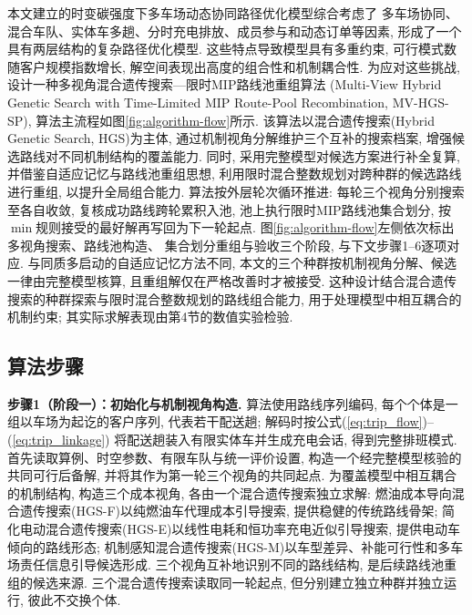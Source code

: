 \documentclass{setp-new}
\begin{document}
本文建立的时变碳强度下多车场动态协同路径优化模型综合考虑了
多车场协同、混合车队、实体车多趟、分时充电排放、成员参与和动态订单等因素,
形成了一个具有两层结构的复杂路径优化模型.
这些特点导致模型具有多重约束, 可行模式数随客户规模指数增长,
解空间表现出高度的组合性和机制耦合性.
为应对这些挑战, 设计一种多视角混合遗传搜索—限时MIP路线池重组算法
(Multi-View Hybrid Genetic Search with Time-Limited MIP Route-Pool Recombination, MV-HGS-SP),
算法主流程如图\ref{fig:algorithm-flow}所示.
该算法以混合遗传搜索(Hybrid Genetic Search, HGS)\cite{ref:76,ref:77}为主体,
通过机制视角分解维护三个互补的搜索档案, 增强候选路线对不同机制结构的覆盖能力.
同时, 采用完整模型对候选方案进行补全复算,
并借鉴自适应记忆与路线池重组思想\cite{ref:79,ref:80},
利用限时混合整数规划对跨种群的候选路线进行重组, 以提升全局组合能力.
算法按外层轮次循环推进: 每轮三个视角分别搜索至各自收敛,
复核成功路线跨轮累积入池, 池上执行限时MIP路线池集合划分,
按$\min$规则接受的最好解再写回为下一轮起点.
图\ref{fig:algorithm-flow}左侧依次标出多视角搜索、路线池构造、
集合划分重组与验收三个阶段, 与下文步骤1--6逐项对应.
与同质多启动的自适应记忆方法不同,
本文的三个种群按机制视角分解、候选一律由完整模型核算,
且重组解仅在严格改善时才被接受.
这种设计结合混合遗传搜索的种群探索与限时混合整数规划的路线组合能力,
用于处理模型中相互耦合的机制约束; 其实际求解表现由第4节的数值实验检验.



\subsection{算法步骤}

\textbf{步骤1（阶段一）：初始化与机制视角构造.}
算法使用路线序列编码, 每个个体是一组以车场为起讫的客户序列,
代表若干配送趟; 解码时按公式(\ref{eq:trip_flow})--(\ref{eq:trip_linkage})
将配送趟装入有限实体车并生成充电会话, 得到完整排班模式.
首先读取算例、时空参数、有限车队与统一评价设置, 构造一个经完整模型核验的共同可行后备解,
并将其作为第一轮三个视角的共同起点.
为覆盖模型中相互耦合的机制结构, 构造三个成本视角, 各由一个混合遗传搜索独立求解:
燃油成本导向混合遗传搜索(HGS-F)以纯燃油车代理成本引导搜索, 提供稳健的传统路线骨架;
简化电动混合遗传搜索(HGS-E)以线性电耗和恒功率充电近似引导搜索, 提供电动车倾向的路线形态;
机制感知混合遗传搜索(HGS-M)以车型差异、补能可行性和多车场责任信息引导候选形成.
三个视角互补地识别不同的路线结构, 是后续路线池重组的候选来源.
三个混合遗传搜索读取同一轮起点, 但分别建立独立种群并独立运行, 彼此不交换个体.
\end{document}
